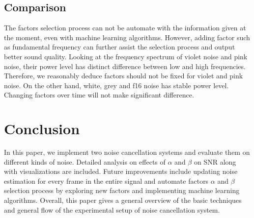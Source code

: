 \documentclass[journal]{IEEEtran}
\begin{document}
\subsection{Comparison}
\begin{flushleft}
The factors selection process can not be automate with the information given at the moment, even with machine learning algorithms. However, adding factor such as fundamental frequency can further assist the selection process and output better sound quality. Looking at the frequency spectrum of violet noise and pink noise, their power level has distinct difference between low and high frequencies. Therefore, we reasonably deduce factors should not be fixed for violet and pink noise. On the other hand, white, grey and f16 noise has stable power level. Changing factors over time will not make significant difference. 
\end{flushleft}

\section{Conclusion}
\begin{flushleft}
In this paper, we implement two noise cancellation systems and evaluate them on different kinds of noise. Detailed analysis on effects of $\alpha$ and $\beta$ on SNR along with visualizations are included. Future improvements include updating noise estimation for every frame in the entire signal and automate factors $\alpha$ and $\beta$ selection process by exploring new factors and implementing machine learning algorithms. Overall, this paper gives a general overview of the basic techniques and general flow of the experimental setup of noise cancellation system. 
\end{flushleft}


%
\end{document}
